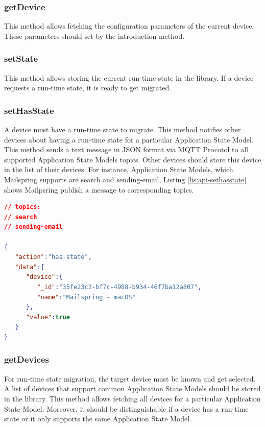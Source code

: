 \subsubsection{getDevice}
This method allows fetching the configuration parameters of the current device. These parameters should set by the introduction method.

\subsubsection{setState}
This method allows storing the current run-time state in the library. If a  device requests a run-time state, it is ready to get migrated. 

\subsubsection{setHasState}
A device must have a run-time state to migrate. This method notifies other devices about having a run-time state for a particular Application State Model. This method sends a text message in JSON format via MQTT Procotol to all supported Application State Models topics. Other devices should store this device in the list of their devices. For instance, Application State Models, which Mailspring supports are search and sending-email, Listing \ref{lis:api-sethasstate} shows Mailpsring publish a message to corresponding topics.

\lstset{
  label=lis:api-sethasstate,caption=Mailspring informs other devices that has a run-time state.
}
\begin{lstlisting}[language=json]
// topics:
// search
// sending-email

{
   "action":"has-state",
   "data":{
      "device":{
         "_id":"35fe23c2-bf7c-4988-b934-46f7ba12a807",
         "name":"Mailspring - macOS"
      },
      "value":true
   }
}
\end{lstlisting}


\subsubsection{getDevices}
For run-time state migration, the target device must be known and get selected. A list of devices that support common Application State Models should be stored in the library. This method allows fetching all devices for a particular Application State Model. Moreover, it should be distinguishable if a device has a run-time state or it only supports the same Application State Model.

